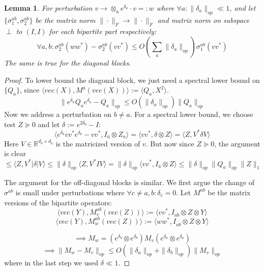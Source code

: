 \documentclass{article}
\newtheorem{lemma}[theorem]{Lemma}
\newcommand{\R}{{\mathbb{R}}}
\begin{document}
\begin{lemma}\label{lem:block-perturbation}
For perturbation $v \to \otimes_{a} e^{\delta_{a}} \cdot v =: w$ where $\forall a: \|\delta_{a}\|_{op} \ll 1$, and let $\{\sigma_{1}^{ab}, \sigma_{2}^{ab}\}$ be the matrix norm $\|\cdot\|_{F} \to \|\cdot\|_{F}$ and matrix norm on subspace $\perp$ to $(I,I)$ for each bipartite part respectively:
\[ \forall a,b: \sigma_{2}^{ab}(w w^{*}) - \sigma_{2}^{ab}(v v^{*}) \leq O \left( \sum_{a} \|\delta_{a}\|_{op}  \right) \sigma_{1}^{ab}(v v^{*})   \]
The same is true for the diagonal blocks. 
\end{lemma}
\begin{proof}
To lower bound the diagonal block, we just need a spectral lower bound on $\{Q_{a}\}$, since $\langle vec(X), M^{a} (vec(X)) \rangle := \langle Q_{a}, X^{2} \rangle$. 
\[ \| e^{\delta_{a}} Q_{a} e^{\delta_{a}} - Q_{a}\|_{op} \leq O(\|\delta_{a}\|_{op}) \|Q_{a}\|_{op}   \]
Now we address a perturbation on $b \neq a$. For a spectral lower bound, we choose test $Z \succeq 0$ and let $\delta := e^{2\delta_{b}} - I$:
\[ \langle e^{\delta_{b}} v v^{*} e^{\delta_{b}} - v v^{*}, I_{\overline{a}} \otimes Z_{a} \rangle 
= \langle v v^{*}, \delta \otimes Z \rangle = \langle Z, V^{*} \delta V \rangle   \]
Here $V \in \R^{d_{b} \times d_{a}}$ is the matricized version of $v$. But now since $Z \succeq 0$, the argument is clear
\[ \leq \langle Z, V^{*} |\delta| V \rangle \leq \|\delta\|_{op} \langle Z, V^{*} I V \rangle = \|\delta\|_{op} \langle v v^{*}, I_{\overline{a}} \otimes Z \rangle \leq \|\delta\|_{op} \|Q_{a}\|_{op} \|Z\|_{1}    \]

The argument for the off-diagonal blocks is similar. We first argue the change of $\sigma^{ab}$ is small under perturbations where $\forall c \neq a,b: \delta_{c} = 0$. Let $M^{ab}$ be the matrix versions of the bipartite operators:
\[ \langle vec(Y), M_{v}^{ab}(vec(Z)) \rangle := \langle v v^{*}, I_{\overline{ab}} \otimes Z \otimes Y \rangle \] 
\[ \langle vec(Y), M_{w}^{ab}(vec(Z)) \rangle := \langle w w^{*}, I_{\overline{ab}} \otimes Z \otimes Y \rangle\]

\[ \implies M_{w} = (e^{\delta_{b}} \otimes e^{\delta_{b}}) M_{v} (e^{\delta_{a}} \otimes e^{\delta_{a}})   \]
\[ \implies \|M_{w} - M_{v}\|_{op} \leq O(\|\delta_{a}\|_{op} + \|\delta_{b}\|_{op}) \|M_{v}\|_{op}   \]
where in the last step we used $\delta \ll 1$. 


\end{proof}
\end{document}
